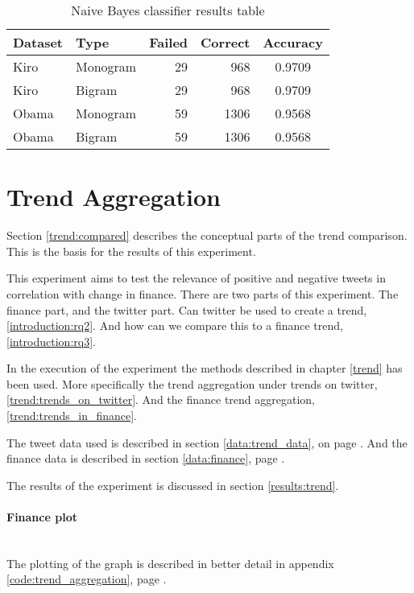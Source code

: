 \begin{table}
\centering
\label{tbl:naive_bayes_classification_results}
\caption{Naive Bayes classifier results table}
\begin{tabular}{ l l r r c }
Dataset & Type & Failed & Correct & Accuracy \\ 
\hline 
Kiro & Monogram & 29 & 968 & 0.9709 \\
Kiro & Bigram & 29 & 968 & 0.9709 \\
Obama & Monogram & 59 & 1306 & 0.9568 \\
Obama & Bigram & 59 & 1306 & 0.9568 \\
\end{tabular}
\end{table}
%

\section{Trend Aggregation}\label{experiments:trend}
Section \ref{trend:compared} describes the
conceptual parts of the trend comparison. This is the basis for the results of
this experiment. 

This experiment aims to test the relevance of positive and negative tweets in
correlation with change in finance. There are two parts of this experiment. The
finance part, and the twitter part. Can twitter be used to create a trend,
\ref{introduction:rq2}. And how can we compare this to a finance trend,
\ref{introduction:rq3}.

In the execution of the experiment the methods described in chapter \ref{trend}
has been used. More specifically the trend aggregation under trends on twitter,
\ref{trend:trends_on_twitter}. And the finance trend aggregation,
\ref{trend:trends_in_finance}.

The tweet data used is described in section \ref{data:trend_data}, on page
\pageref{data:trend_data}. And the finance data is described in section
\ref{data:finance}, page \pageref{data:finance}.

The results of the experiment is discussed in section \ref{results:trend}. 

\paragraph{Finance plot}
\hspace{0pt}\\
The plotting of the graph is described in better detail in appendix
\ref{code:trend_aggregation}, page \pageref{code:trend_aggregation}.

